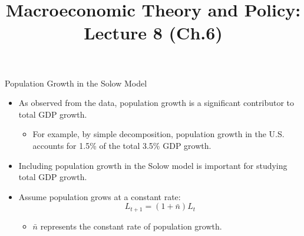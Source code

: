 \documentclass[aspectratio=1610]{beamer}
\title[Fall - Lecture 8] %
{Macroeconomic Theory and Policy: Lecture  8 (Ch.6)}
\author[University of Toronto] %
{}
\date[] %
\begin{document}
\begin{frame}
  \titlepage
\end{frame}


\begin{frame}[wide]{Population Growth in the Solow Model}
	\begin{itemize}
		\item As observed from the data, population growth is a significant contributor to total GDP growth.
		\begin{itemize}
			\item For example, by simple decomposition, population growth in the U.S. accounts for 1.5\% of the total 3.5\% GDP growth.
		\end{itemize}
		\item Including population growth in the Solow model is important for studying total GDP growth.
		\item Assume population grows at a constant rate:
		\[
		L_{t+1} = (1 + \bar{n}) L_t
		\]
		\begin{itemize}
			\item \(\bar{n}\) represents the constant rate of population growth.
		\end{itemize}
	\end{itemize}
\end{frame}
\end{document}
